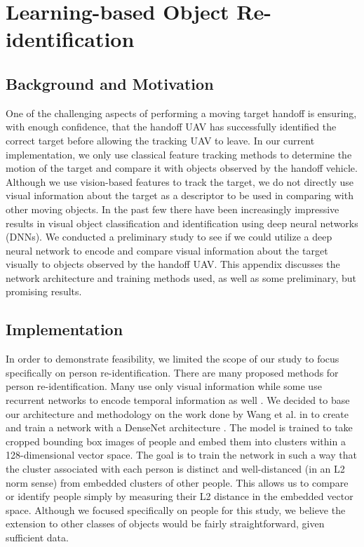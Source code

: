 
\chapter{Learning-based Object Re-identification}

\section{Background and Motivation}
One of the challenging aspects of performing a moving target handoff is ensuring, with enough confidence, that the handoff UAV has successfully identified the correct target before allowing the tracking UAV to leave.
In our current implementation, we only use classical feature tracking methods to determine the motion of the target and compare it with objects observed by the handoff vehicle.
Although we use vision-based features to track the target, we do not directly use visual information about the target as a descriptor to be used in comparing with other moving objects.
In the past few there have been increasingly impressive results in visual object classification and identification using deep neural networks (DNNs).
We conducted a preliminary study to see if we could utilize a deep neural network to encode and compare visual information about the target visually to objects observed by the handoff UAV. This appendix discusses the network architecture and training methods used, as well as some preliminary, but promising results.

\section{Implementation}
In order to demonstrate feasibility, we limited the scope of our study to focus specifically on person re-identification. There are many proposed methods for person re-identification. Many use only visual information \cite{} while some use recurrent networks to encode temporal information as well \cite{}.
We decided to base our architecture and methodology on the work done by Wang et al. in \cite{Wang2018} to create and train a network with a DenseNet architecture \cite{DenseNet}. The model is trained to take cropped bounding box images of people and embed them into clusters within a 128-dimensional vector space. The goal is to train the network in such a way that the cluster associated with each person is distinct and well-distanced (in an L2 norm sense) from embedded clusters of other people. This allows us to compare or identify people simply by measuring their L2 distance in the embedded vector space. Although we focused specifically on people for this study, we believe the extension to other classes of objects would be fairly straightforward, given sufficient data.

